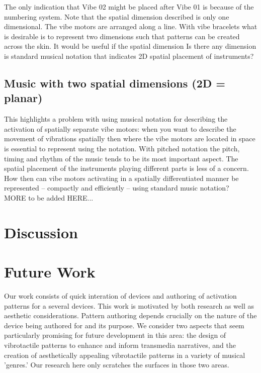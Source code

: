 \documentclass[a4paper, twocolumn]{article}
\begin{document}
The only indication that Vibe 02 might be placed after Vibe 01 is because of the numbering system. Note that the spatial dimension described is only one dimensional. The vibe motors are arranged along a line. With vibe bracelets what is desirable is to represent two dimensions such that patterns can be created across the skin. It would be useful if the spatial dimension Is there any dimension is standard musical notation that indicates 2D spatial placement of instruments? 

\subsection{Music with two spatial dimensions (2D = planar)}

This highlights a problem with using musical notation for describing the activation of spatially separate vibe motors: when you want to describe the movement of vibrations spatially then where the vibe motors are located in space is essential to represent using the notation. With pitched notation the pitch, timing and rhythm of the music tends to be its most important aspect. The spatial placement of the instruments playing different parts is less of a concern. How then can vibe motors activating in a spatially differentiated manner be represented -- compactly and efficiently -- using standard music notation?\\

MORE to be added HERE...

\section{Discussion}



\section{Future Work}


Our work consists of quick interation of devices and authoring of activation patterns for a several devices. This work is motivated by both research as well as aesthetic considerations. Pattern authoring depends crucially on the nature of the device being authored for and its purpose. We consider two aspects that seem particularly promising for future development in this area: the design of vibrotactile patterns to enhance and inform transmedia narratives, and the creation of aesthetically appealing vibrotactile patterns in a variety of musical 'genres.' Our research here only scratches the surfaces in those two areas. 
\end{document}
